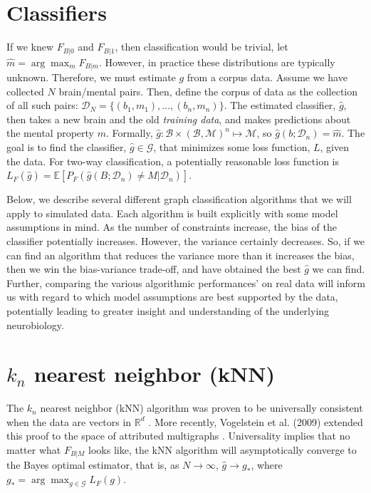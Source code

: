 \documentclass{article}
\newcommand{\mB}{\mathcal{B}}
\newcommand{\mD}{\mathcal{D}}
\newcommand{\mG}{\mathcal{G}}
\newcommand{\mM}{\mathcal{M}}
\newcommand{\hg}{\widehat{g}}
\newcommand{\hm}{\widehat{m}}
\newcommand{\Real}{\mathbb{R}}
\newcommand{\conv}{\rightarrow}
\begin{document}


\section{Classifiers} %
\label{sec:classifiers}

If we knew $F_{B|0}$ and $F_{B|1}$, then classification would be trivial, let $\hm=\arg \max_{m} F_{B|m}$.   However, in practice these distributions are typically unknown. Therefore, we must estimate $g$ from a corpus data. Assume we have collected $N$ brain/mental pairs. Then, define the corpus of data as the collection of all such pairs: $\mD_{N}=\{(b_1,m_1), \ldots, (b_n,m_n)\}$. The estimated classifier, $\hg$, then takes a new brain and the old \emph{training data}, and makes predictions about the mental property $m$. Formally, $\hg: \mB \times (\mB, \mM)^n \mapsto \mM$, so $\hg(b; \mD_n)=\hm$.  The goal is to find the classifier, $\hg \in \mG$, that minimizes some loss function, $L$, given the data.  For two-way classification, a potentially reasonable loss function is $L_F(\hg)=\mathbb{E}[P_F(\hg(B;\mD_n) \neq M | \mD_n)]$.  

Below, we describe several different graph classification algorithms that we will apply to simulated data.  Each algorithm is built explicitly with some model assumptions in mind.  As the number of constraints increase, the bias of the classifier potentially increases.  However, the variance certainly decreases.  So, if we can find an algorithm that reduces the variance more than it increases the bias, then we win the bias-variance trade-off, and have obtained the best $\hg$ we can find.  Further, comparing the various algorithmic performances' on real data will inform us with regard to which model assumptions are best supported by the data, potentially leading to greater insight and understanding of the underlying neurobiology.  


\section{$k_n$ nearest neighbor (kNN)} %
\label{sub:_k_n_nearest_neighbor_knn_}

The $k_n$ nearest neighbor (kNN) algorithm was proven to be universally consistent when the data are vectors in $\Real^d$ \cite{Stone77}.  More recently, Vogelstein et al. (2009) extended this proof to the space of attributed multigraphs \cite{VVP09}.  Universality implies that no matter what $F_{B|M}$ looks like, the kNN algorithm will asymptotically converge to the Bayes optimal estimator, that is, as $N\conv\infty$, $\hg \conv g_{\ast}$, where $g_{\ast}= \arg \max_{g\in\mG} L_F(g)$.  
\end{document}

